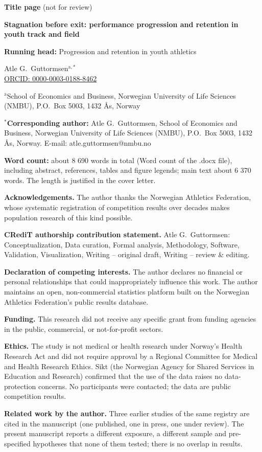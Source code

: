 \documentclass[12pt,a4paper]{article}
\begin{document}
\noindent\textbf{Title page} (not for review)

\bigskip
{\noindent\LARGE\bfseries Stagnation before exit: performance progression and retention in youth track and field\par}

\bigskip
\noindent\textbf{Running head:} Progression and retention in youth athletics

\bigskip
{\noindent\large Atle G.\ Guttormsen$^{\mathrm{a},*}$ \\
\href{https://orcid.org/0000-0003-0188-8462}{ORCID: 0000-0003-0188-8462}\par}

\medskip
\noindent $^{\mathrm{a}}$School of Economics and Business, Norwegian University of Life Sciences (NMBU), P.O.\ Box 5003, 1432 Ås, Norway

\medskip
\noindent $^*$\textbf{Corresponding author:} Atle G.\ Guttormsen, School of Economics and Business, Norwegian University of Life Sciences (NMBU), P.O.\ Box 5003, 1432 Ås, Norway. E-mail: atle.guttormsen@nmbu.no

\bigskip
\noindent\textbf{Word count:} about 8 690 words in total (Word count of the .docx file), including abstract, references, tables and figure legends; main text about 6 370 words. The length is justified in the cover letter.

\bigskip
\noindent\textbf{Acknowledgements.} The author thanks the Norwegian Athletics Federation, whose systematic registration of competition results over decades makes population research of this kind possible.

\bigskip
\noindent\textbf{CRediT authorship contribution statement.} Atle G.\ Guttormsen: Conceptualization, Data curation, Formal analysis, Methodology, Software, Validation, Visualization, Writing -- original draft, Writing -- review \& editing.

\bigskip
\noindent\textbf{Declaration of competing interests.} The author declares no financial or personal relationships that could inappropriately influence this work. The author maintains an open, non-commercial statistics platform built on the Norwegian Athletics Federation's public results database.

\bigskip
\noindent\textbf{Funding.} This research did not receive any specific grant from funding agencies in the public, commercial, or not-for-profit sectors.

\bigskip
\noindent\textbf{Ethics.} The study is not medical or health research under Norway's Health Research Act and did not require approval by a Regional Committee for Medical and Health Research Ethics. Sikt (the Norwegian Agency for Shared Services in Education and Research) confirmed that the use of the data raises no data-protection concerns. No participants were contacted; the data are public competition results.

\bigskip
\noindent\textbf{Related work by the author.} Three earlier studies of the same registry are cited in the manuscript (one published, one in press, one under review). The present manuscript reports a different exposure, a different sample and pre-specified hypotheses that none of them tested; there is no overlap in results.
\end{document}
